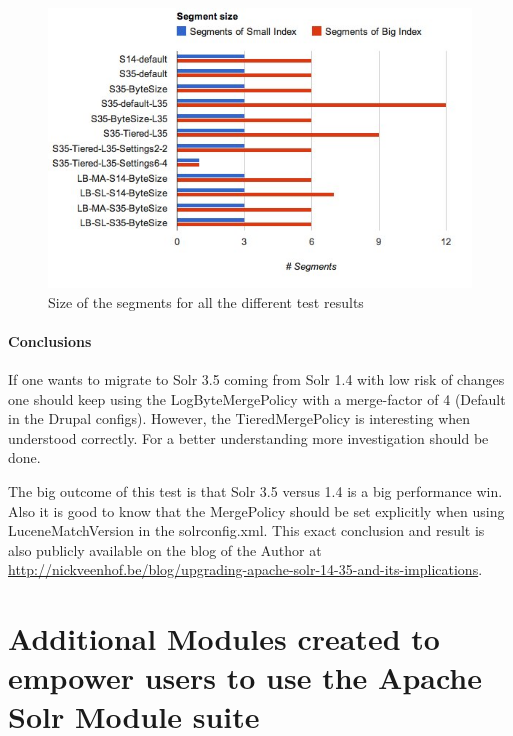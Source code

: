 \begin{figure}
     \includegraphics[width=\textwidth]{images/implementation/segments_0.jpg}
     \caption{Size of the segments for all the different test results}
\end{figure}

\paragraph{Conclusions}
If one wants to migrate to Solr 3.5 coming from Solr 1.4 with low risk of changes one should keep using the LogByteMergePolicy with a merge-factor of 4 (Default in the Drupal configs). 
However, the TieredMergePolicy is interesting when understood correctly. For a better understanding more investigation should be done. 

The big outcome of this test is that Solr 3.5 versus 1.4 is a big performance win. Also it is good to know that the MergePolicy should be set explicitly when using LuceneMatchVersion in the solrconfig.xml. This exact conclusion and result is also publicly available on the blog of the Author at \url{http://nickveenhof.be/blog/upgrading-apache-solr-14-35-and-its-implications}.
\clearpage

\section{Additional Modules created to empower users to use the Apache Solr Module suite}
